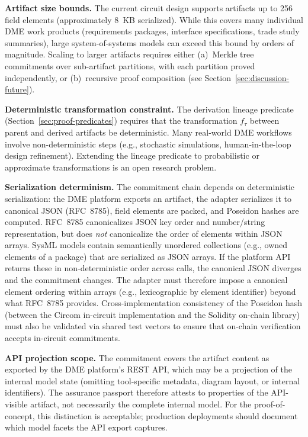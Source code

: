 \textbf{Artifact size bounds.}
The current circuit design supports artifacts up to 256 field elements (approximately 8~KB serialized).
While this covers many individual DME work products (requirements packages, interface specifications, trade study summaries), large system-of-systems models can exceed this bound by orders of magnitude.
Scaling to larger artifacts requires either (a)~Merkle tree commitments over sub-artifact partitions, with each partition proved independently, or (b)~recursive proof composition (see Section~\ref{sec:discussion-future}).

\textbf{Deterministic transformation constraint.}
The derivation lineage predicate (Section~\ref{sec:proof-predicates}) requires that the transformation $f_\tau$ between parent and derived artifacts be deterministic.
Many real-world DME workflows involve non-deterministic steps (e.g., stochastic simulations, human-in-the-loop design refinement).
Extending the lineage predicate to probabilistic or approximate transformations is an open research problem.

\textbf{Serialization determinism.}
The commitment chain depends on deterministic serialization: the DME platform exports an artifact, the adapter serializes it to canonical JSON (RFC~8785), field elements are packed, and Poseidon hashes are computed.
RFC~8785 canonicalizes JSON key order and number/string representation, but does \emph{not} canonicalize the order of elements within JSON arrays.
SysML models contain semantically unordered collections (e.g., owned elements of a package) that are serialized as JSON arrays.
If the platform API returns these in non-deterministic order across calls, the canonical JSON diverges and the commitment changes.
The adapter must therefore impose a canonical element ordering within arrays (e.g., lexicographic by element identifier) beyond what RFC~8785 provides.
Cross-implementation consistency of the Poseidon hash (between the Circom in-circuit implementation and the Solidity on-chain library) must also be validated via shared test vectors to ensure that on-chain verification accepts in-circuit commitments.

\textbf{API projection scope.}
The commitment covers the artifact content as exported by the DME platform's REST API, which may be a projection of the internal model state (omitting tool-specific metadata, diagram layout, or internal identifiers).
The assurance passport therefore attests to properties of the API-visible artifact, not necessarily the complete internal model.
For the proof-of-concept, this distinction is acceptable; production deployments should document which model facets the API export captures.

